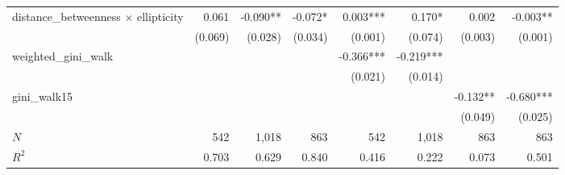 \begin{tabular}{lrrrrrrr}
distance\_betweenness $\times$ ellipticity &                        0.061 &                   -0.090** &                      -0.072* &                         0.003*** &                         0.170* &                                                             0.002 &                                            -0.003** \\ 
                                           &                      (0.069) &                    (0.028) &                      (0.034) &                          (0.001) &                        (0.074) &                                                           (0.003) &                                             (0.001) \\ 
weighted\_gini\_walk                       &                              &                            &                              &                        -0.366*** &                      -0.219*** &                                                                   &                                                     \\ 
                                           &                              &                            &                              &                          (0.021) &                        (0.014) &                                                                   &                                                     \\ 
gini\_walk15                               &                              &                            &                              &                                  &                                &                                                          -0.132** &                                           -0.680*** \\ 
                                           &                              &                            &                              &                                  &                                &                                                           (0.049) &                                             (0.025) \\ 
\midrule
$N$                                        &                          542 &                      1,018 &                          863 &                              542 &                          1,018 &                                                               863 &                                                 863 \\ 
$R^2$                                      &                        0.703 &                      0.629 &                        0.840 &                            0.416 &                          0.222 &                                                             0.073 &                                               0.501 \\ 
\bottomrule
\end{tabular}
